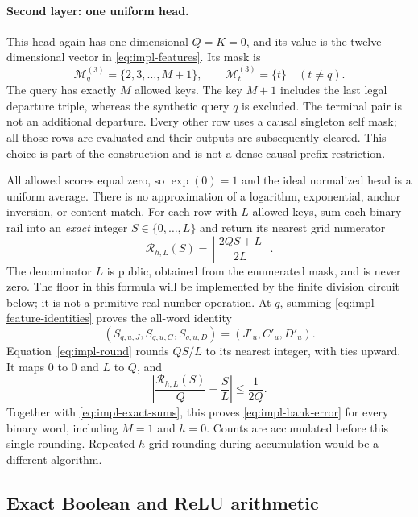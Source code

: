 \paragraph{Second layer: one uniform head.}
This head again has one-dimensional $Q=K=0$, and its value is the
twelve-dimensional vector in \eqref{eq:impl-features}. Its mask is
\begin{equation}\label{eq:impl-uniform-mask}
 \mathcal M^{(3)}_q=\{2,3,\ldots,M+1\},\qquad
 \mathcal M^{(3)}_t=\{t\}\quad(t\ne q).
\end{equation}
The query has exactly $M$ allowed keys. The key $M+1$ includes the last
legal departure triple, whereas the synthetic query $q$ is excluded.
The terminal pair is not an additional departure. Every other row uses a
causal singleton self mask; all those rows are evaluated and their
outputs are subsequently cleared. This choice is part of the construction
and is not a dense causal-prefix restriction.

All allowed scores equal zero, so $\exp(0)=1$ and the ideal normalized
head is a uniform average. There is no approximation of a logarithm,
exponential, anchor inversion, or content match. For each row with $L$
allowed keys, sum each binary rail into an \emph{exact} integer
$S\in\{0,\ldots,L\}$ and return its nearest grid numerator
\begin{equation}\label{eq:impl-round}
 \mathcal R_{h,L}(S)
 =\left\lfloor\frac{2QS+L}{2L}\right\rfloor.
\end{equation}
The denominator $L$ is public, obtained from the enumerated mask, and is
never zero. The floor in this formula will be implemented by the finite
division circuit below; it is not a primitive real-number operation.
At $q$, summing \eqref{eq:impl-feature-identities} proves the all-word
identity
\begin{equation}\label{eq:impl-exact-sums}
 (S_{q,u,J},S_{q,u,C},S_{q,u,D})=(J'_u,C'_u,D'_u).
\end{equation}
Equation~\eqref{eq:impl-round} rounds $QS/L$ to its nearest integer, with
ties upward. It maps $0$ to $0$ and $L$ to $Q$, and
\[
 \left|\frac{\mathcal R_{h,L}(S)}Q-\frac SL\right|
 \le\frac1{2Q}.
\]
Together with \eqref{eq:impl-exact-sums}, this proves
\eqref{eq:impl-bank-error} for every binary word, including $M=1$ and
$h=0$. Counts are accumulated before this single rounding. Repeated
$h$-grid rounding during accumulation would be a different algorithm.

\subsection{Exact Boolean and ReLU arithmetic}\label{sec:impl-arithmetic}

